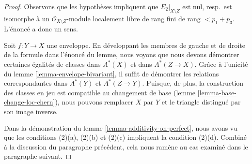 \begin{proof}
Observons que les hypothèses impliquent que $E_2|_{X \setminus Z}$ est nul,
resp.\ est isomorphe à un $\mathcal{O}_{X \setminus Z}$-module localement libre de rang fini
de rang $< p_1 + p_3$. L'énoncé a donc un sens.

\medskip\noindent
Soit $f : Y \to X$ une enveloppe. En développant les membres de gauche et de droite
de la formule dans l'énoncé du lemme, nous voyons que nous devons démontrer
certaines égalités de classes dans $A^*(X)$ et dans $A^*(Z \to X)$. Grâce à
l'unicité du lemme \ref{lemma-envelope-bivariant}, il suffit de démontrer les
relations correspondantes dans $A^*(Y)$ et $A^*(Z \to Y)$. Puisque, de plus,
la construction des classes en jeu est compatible au changement de base
(lemme \ref{lemma-base-change-loc-chern}), nous pouvons remplacer $X$ par $Y$
et le triangle distingué par son image inverse.

\medskip\noindent
Dans la démonstration du lemme \ref{lemma-additivity-on-perfect}, nous avons
vu que les conditions (2)(a), (2)(b) et (2)(c) impliquent la condition
(2)(d). Combiné à la discussion du paragraphe précédent, cela nous
ramène au cas examiné dans le paragraphe suivant.


\end{proof}
